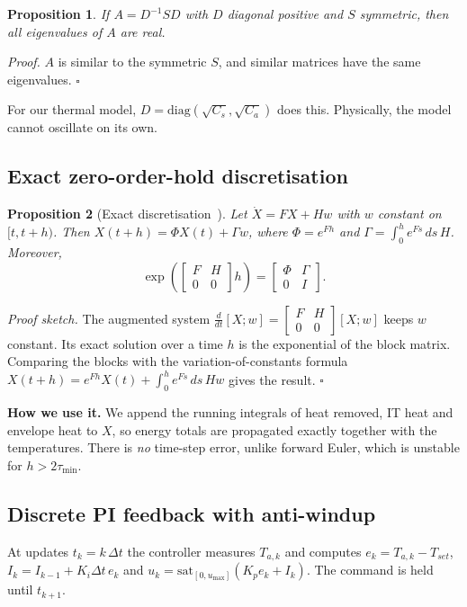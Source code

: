 \documentclass[12pt,a4paper]{report}
\newtheorem{proposition}{Proposition}[chapter]
\theoremstyle{definition}
\begin{document}
\begin{proposition}\label{prop:sym}
If $A=D^{-1}SD$ with $D$ diagonal positive and $S$ symmetric, then all eigenvalues of $A$ are real.
\end{proposition}
\noindent\emph{Proof.} $A$ is similar to the symmetric $S$, and similar matrices have the same eigenvalues. \hfill$\square$

\noindent For our thermal model, $D=\mathrm{diag}(\sqrt{C_s},\sqrt{C_a})$ does this. Physically, the model cannot oscillate on its own.

\subsection*{Exact zero-order-hold discretisation}
\begin{proposition}[Exact discretisation~\cite{vanloan1978}]\label{prop:zoh}
Let $\dot X=FX+Hw$ with $w$ constant on $[t,t+h)$. Then $X(t+h)=\Phi X(t)+\Gamma w$, where $\Phi=e^{Fh}$ and $\Gamma=\int_0^h e^{Fs}\,ds\,H$. Moreover,
\[
\exp\!\left(\begin{bmatrix}F&H\\0&0\end{bmatrix}h\right)=\begin{bmatrix}\Phi&\Gamma\\0&I\end{bmatrix}.
\]
\end{proposition}
\noindent\emph{Proof sketch.} The augmented system $\frac{d}{dt}[X;w]=\begin{bmatrix}F&H\\0&0\end{bmatrix}[X;w]$ keeps $w$ constant. Its exact solution over a time $h$ is the exponential of the block matrix. Comparing the blocks with the variation-of-constants formula $X(t+h)=e^{Fh}X(t)+\int_0^h e^{Fs}\,ds\,Hw$ gives the result. \hfill$\square$

\noindent \textbf{How we use it.} We append the running integrals of heat removed, IT heat and envelope heat to $X$, so energy totals are propagated exactly together with the temperatures. There is \emph{no} time-step error, unlike forward Euler, which is unstable for $h>2\tau_{\min}$.

\subsection*{Discrete PI feedback with anti-windup}
At updates $t_k=k\,\Delta t$ the controller measures $T_{a,k}$ and computes $e_k=T_{a,k}-T_{set}$, $I_k=I_{k-1}+K_i\Delta t\,e_k$ and $u_k=\mathrm{sat}_{[0,u_{\max}]}(K_pe_k+I_k)$. The command is held until $t_{k+1}$.
\end{document}

